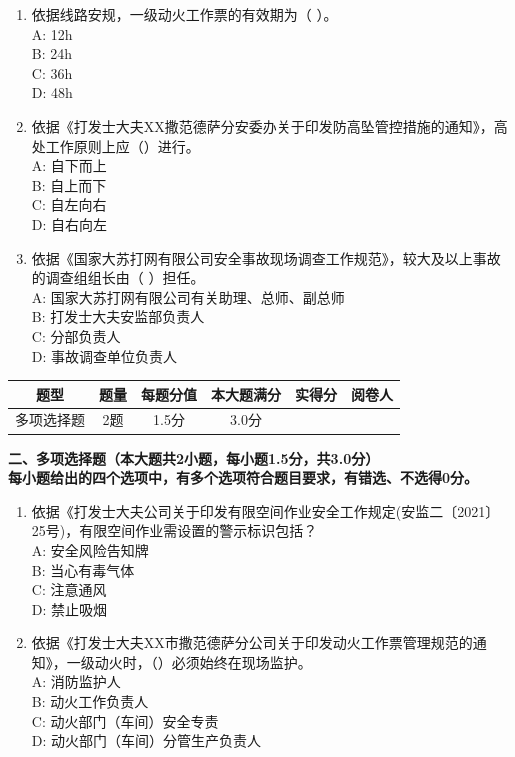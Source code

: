 \documentclass[12pt,a4paper,onecolumn]{ctexart}
\begin{document}
\begin{enumerate}
    \item 依据线路安规，一级动火工作票的有效期为（    ）。 \\ A: 12h \\ B: 24h \\ C: 36h \\ D: 48h \item 依据《打发士大夫XX撒范德萨分安委办关于印发防高坠管控措施的通知》，高处工作原则上应（）进行。 \\ A: 自下而上 \\ B: 自上而下 \\ C: 自左向右 \\ D: 自右向左 \item 依据《国家大苏打网有限公司安全事故现场调查工作规范》，较大及以上事故的调查组组长由（ ）担任。 \\ A: 国家大苏打网有限公司有关助理、总师、副总师 \\ B: 打发士大夫安监部负责人 \\ C: 分部负责人 \\ D: 事故调查单位负责人
\end{enumerate}
\vspace{10pt}
\begin{flushleft}
\begin{tabular}{|c|c|c|c|c|c|}
\hline
题型 & 题量 & 每题分值 & 本大题满分 & 实得分 & 阅卷人 \\
\hline
多项选择题 & 2题 & 1.5分 & 3.0分 & & \\
\hline
\end{tabular}
\end{flushleft}
\noindent{}\bfseries{二、多项选择题（本大题共2小题，每小题1.5分，共3.0分）}\\
\vspace{2pt}
\noindent{}每小题给出的四个选项中，有多个选项符合题目要求，有错选、不选得0分。
\begin{enumerate}
    \item 依据《打发士大夫公司关于印发有限空间作业安全工作规定(安监二〔2021〕25号)，有限空间作业需设置的警示标识包括？ \\ A: 安全风险告知牌 \\ B: 当心有毒气体 \\ C: 注意通风 \\ D: 禁止吸烟 \item 依据《打发士大夫XX市撒范德萨分公司关于印发动火工作票管理规范的通知》，一级动火时，（）必须始终在现场监护。 \\ A: 消防监护人 \\ B: 动火工作负责人 \\ C: 动火部门（车间）安全专责 \\ D: 动火部门（车间）分管生产负责人
\end{enumerate}
\end{document}

